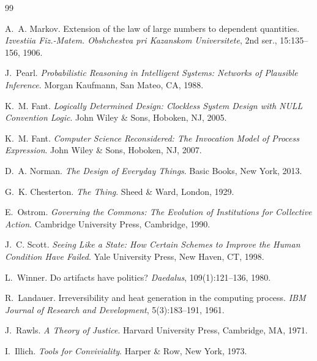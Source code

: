 \documentclass[12pt, a4paper]{article}
\begin{document}
\begin{thebibliography}{99}

A.~A. Markov.
\newblock Extension of the law of large numbers to dependent quantities.
\newblock \emph{Izvestiia Fiz.-Matem. Obshchestva pri Kazanskom Universitete},
  2nd ser., 15:135--156, 1906.

J.~Pearl.
\newblock \emph{Probabilistic Reasoning in Intelligent Systems: Networks of
  Plausible Inference}.
\newblock Morgan Kaufmann, San Mateo, CA, 1988.

K.~M. Fant.
\newblock \emph{Logically Determined Design: Clockless System Design with NULL
  Convention Logic}.
\newblock John Wiley \& Sons, Hoboken, NJ, 2005.

K.~M. Fant.
\newblock \emph{Computer Science Reconsidered: The Invocation Model of Process
  Expression}.
\newblock John Wiley \& Sons, Hoboken, NJ, 2007.

D.~A. Norman.
\newblock \emph{The Design of Everyday Things}.
\newblock Basic Books, New York, 2013.

G.~K. Chesterton.
\newblock \emph{The Thing}.
\newblock Sheed \& Ward, London, 1929.

E.~Ostrom.
\newblock \emph{Governing the Commons: The Evolution of Institutions for
  Collective Action}.
\newblock Cambridge University Press, Cambridge, 1990.

J.~C. Scott.
\newblock \emph{Seeing Like a State: How Certain Schemes to Improve the Human
  Condition Have Failed}.
\newblock Yale University Press, New Haven, CT, 1998.

L.~Winner.
\newblock Do artifacts have politics?
\newblock \emph{Daedalus}, 109(1):121--136, 1980.

R.~Landauer.
\newblock Irreversibility and heat generation in the computing process.
\newblock \emph{IBM Journal of Research and Development}, 5(3):183--191, 1961.

J.~Rawls.
\newblock \emph{A Theory of Justice}.
\newblock Harvard University Press, Cambridge, MA, 1971.

I.~Illich.
\newblock \emph{Tools for Conviviality}.
\newblock Harper \& Row, New York, 1973.

\end{thebibliography}
\end{document}
